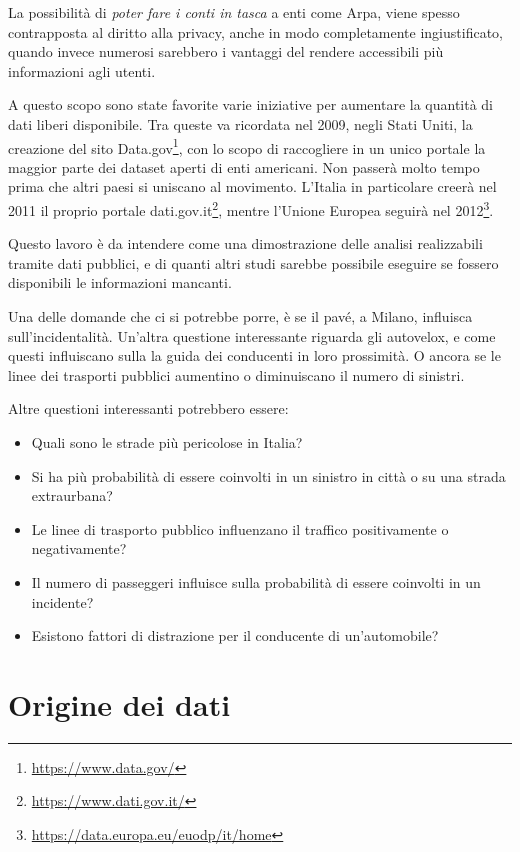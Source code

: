 \documentclass[a4paper,12pt]{report}
\newcommand{\quotestyle}[1]{\textit{#1}}
\newcommand{\skipline}{\vspace{0.2in}}
\begin{document}
La possibilità di \quotestyle{poter fare i conti in tasca} a enti come Arpa, 
viene spesso contrapposta al diritto alla privacy, anche in 
modo completamente ingiustificato, quando invece numerosi sarebbero i vantaggi 
del rendere accessibili più informazioni agli utenti.

A questo scopo sono state favorite varie iniziative per aumentare la quantità di 
dati liberi disponibile. 
Tra queste va ricordata nel 2009, negli Stati Uniti, la creazione del sito 
Data.gov\footnote{\url{https://www.data.gov/}}, 
con lo scopo di raccogliere in un unico portale la maggior parte dei dataset 
aperti di enti americani. 
Non passerà molto tempo prima che altri paesi si uniscano al movimento. 
L'Italia in particolare creerà nel 2011 il proprio portale 
dati.gov.it\footnote{\url{https://www.dati.gov.it/}}, mentre l'Unione Europea seguirà 
nel 2012\footnote{\url{https://data.europa.eu/euodp/it/home}}. 

\skipline
Questo lavoro è da intendere come una dimostrazione delle analisi realizzabili 
tramite dati pubblici, e di quanti altri studi sarebbe possibile eseguire se fossero 
disponibili le informazioni mancanti. 

Una delle domande che ci si potrebbe porre, è se il pavé, a Milano, 
influisca sull'incidentalità. 
Un'altra questione interessante riguarda gli autovelox, e come questi influiscano sulla 
la guida dei conducenti in loro prossimità. 
O ancora se le linee dei trasporti pubblici aumentino o diminuiscano il numero di sinistri. 

Altre questioni interessanti potrebbero essere:
\begin{itemize}
    \item Quali sono le strade più pericolose in Italia?
    \item Si ha più probabilità di essere coinvolti in un sinistro in città o su una 
    strada extraurbana? 
    \item Le linee di trasporto pubblico influenzano il traffico positivamente 
    o negativamente?
    \item Il numero di passeggeri influisce sulla probabilità di essere coinvolti 
    in un incidente? 
    \item Esistono fattori di distrazione per il conducente di un'automobile? 
\end{itemize}

\chapter{Origine dei dati}
\end{document}
